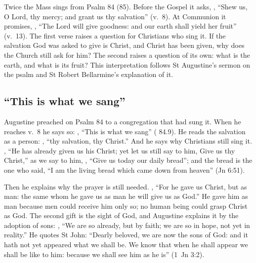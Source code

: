 
Twice the Mass sings from Psalm 84 (85). Before the Gospel it asks,
,
``Shew us, O Lord, thy mercy; and grant us thy salvation'' (v.~8). At
Communion it promises, , ``The Lord will give goodness: and our earth shall yield
her fruit'' (v.~13). The first verse raises a question for Christians who sing
it. If the salvation God was asked to give is Christ, and Christ has been
given, why does the Church still ask for him? The second raises a question of
its own: what is the earth, and what is its fruit? This interpretation follows
St Augustine's sermon on the psalm and St Robert Bellarmine's explanation of
it.

\subsection{``This is what we sang''}

Augustine preached on Psalm 84 to a congregation that had sung it. When
he reaches v.~8 he says so: , ``This is what we
sang'' ( 84.9). He reads the salvation as a
person: , ``thy salvation, thy Christ.''
And he says why Christians still sing it. ,
``He has already given us his Christ; yet let us still say to him, Give us thy
Christ,'' as we say to him, ,
``Give us today our daily bread''; and the bread is the one who said, ``I am
the living bread which came down from heaven'' (Jn 6:51).

Then he explains why the prayer is still needed. , ``For he gave us Christ, but as man: the same whom he gave us as man he
will give us as God.'' He gave him as man because men could receive him only
so; no human being could grasp Christ as God. The second gift is the sight of
God, and Augustine explains it by the adoption of sons: , ``We are so
already, but by faith; we are so in hope, not yet in reality.'' He quotes St
John: ``Dearly beloved, we are now the sons of God: and it hath not yet
appeared what we shall be. We know that when he shall appear we shall be like
to him: because we shall see him as he is'' (1~Jn 3:2).

